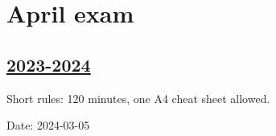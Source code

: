 


\newpage
\thispagestyle{empty}
\section{April exam}



\subsection[2023-2024]{\hyperref[sec:sol_kr_03_2023_2024]{2023-2024}}
\label{sec:kr_03_2023_2024} %

Short rules: 120 minutes, one A4 cheat sheet allowed. 

Date: 2024-03-05

